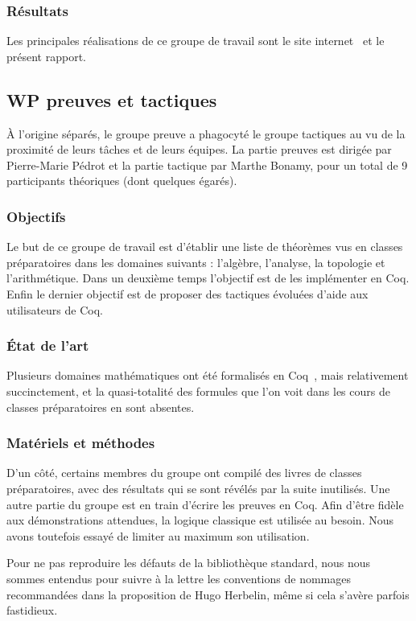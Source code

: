 \documentclass[a4paper,10pt]{article}
\begin{document}
\subsubsection{Résultats}
Les principales réalisations de ce groupe de travail sont le site internet~\cite{coquille} et le présent rapport.

\subsection{WP preuves et tactiques}
À l'origine séparés, le groupe preuve a phagocyté le groupe tactiques au vu de la proximité de leurs tâches et de leurs équipes. La partie preuves est dirigée par Pierre-Marie Pédrot et la partie tactique par Marthe Bonamy, pour un total de 9 participants théoriques (dont quelques égarés).

\subsubsection{Objectifs}
Le but de ce groupe de travail est d'établir une liste de théorèmes vus en classes préparatoires dans les domaines suivants : l'algèbre, l'analyse, la topologie et l'arithmétique. Dans un deuxième temps l'objectif est de les implémenter en Coq. Enfin le dernier objectif est de proposer des tactiques évoluées d'aide aux utilisateurs de Coq.

\subsubsection{État de l'art}
Plusieurs domaines mathématiques ont été formalisés en Coq~\cite{ccorn, stdlib}, mais relativement succinctement, et la quasi-totalité des formules que l'on voit dans les cours de classes préparatoires en sont absentes.

\subsubsection{Matériels et méthodes}
D'un côté, certains membres du groupe ont compilé des livres de classes préparatoires, avec des résultats qui se sont révélés par la suite inutilisés. Une autre partie du groupe est en train d'écrire les preuves en Coq. Afin d'être fidèle aux démonstrations attendues, la logique classique est utilisée au besoin. Nous avons toutefois essayé de limiter au maximum son utilisation.

Pour ne pas reproduire les défauts de la bibliothèque standard, nous nous sommes entendus pour suivre à la lettre les conventions de nommages recommandées dans la proposition de Hugo Herbelin, même si cela s'avère parfois fastidieux.
\end{document}

